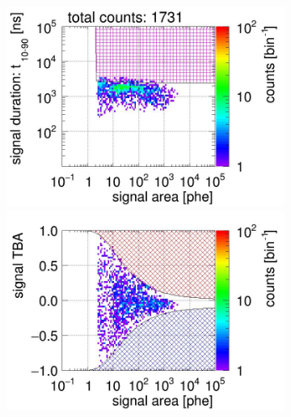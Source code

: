 \begin{landscape}
\begin{figure}[!p]
\begin{subfigure}[t]{0.33\textwidth}
		\caption{}
		\label{fig:signal selection 12}
	\end{subfigure}
	\begin{subfigure}[t]{0.33\textwidth}
		\centering
		\includegraphics[width=\figurewidth,clip,trim={0 98 0 0}]{Figures/GasTest/CutsValid/res64767/pdpa13Vecfig64767.jpg}
		\includegraphics[width=\figurewidth,clip,trim={0 98 0 40}]{Figures/GasTest/CutsValid/res64767/tbapa13Vecfig64767.jpg}

\end{subfigure}
\end{figure}
\end{landscape}
